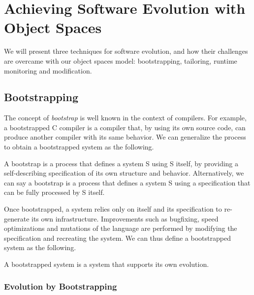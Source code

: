 
\chapter{Achieving Software Evolution with Object Spaces}
\minitoc
\introduction

We will present three techniques for software evolution, and how their challenges are overcame with our object spaces model: bootstrapping, tailoring, runtime monitoring and modification.

\section{Bootstrapping}

The concept of \emph{bootstrap} is  well known in the context of compilers. For example, a bootstrapped C compiler is a compiler that, by using its own source code, can produce another compiler with its same behavior. We can generalize the process to obtain a bootstrapped system as the following.

\begin{definition}
A bootstrap is a process that defines a system S using S itself, by providing a self-describing specification of its own structure and behavior.
Alternatively, we can say a bootstrap is a process that defines a system S using a specification that can be fully processed by S itself.
\end{definition}

Once bootstrapped, a system relies only on itself and its specification to re-generate its own infrastructure.
Improvements such as bugfixing, speed optimizations and mutations of the language are performed by modifying the specification and recreating the system. 
We can thus define a bootstrapped system as the following. 

\begin{definition}
A bootstrapped system is a system that supports its own evolution.
\end{definition}

\subsection{Evolution by Bootstrapping}

